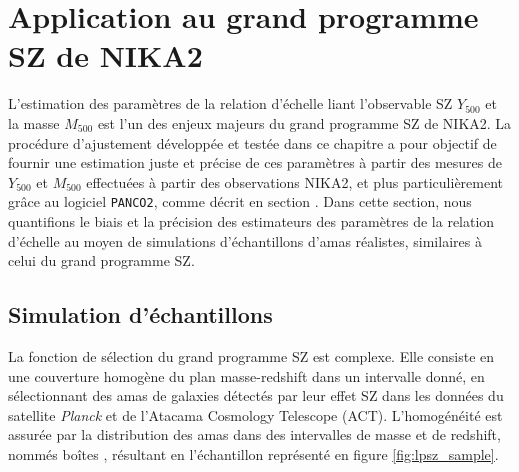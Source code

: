 \section{Application au grand programme SZ de NIKA2}
\label{sec:scaling:lpsz}

L'estimation des paramètres de la relation d'échelle liant l'observable SZ $Y_{500}$ et la masse $M_{500}$ est l'un des enjeux majeurs du grand programme SZ de NIKA2.
La procédure d'ajustement développée et testée dans ce chapitre a pour objectif de fournir une estimation juste et précise de ces paramètres à partir des mesures de $Y_{500}$ et $M_{500}$ effectuées à partir des observations NIKA2, et plus particulièrement grâce au logiciel \texttt{PANCO2}, comme décrit en section .
Dans cette section, nous quantifions le biais et la précision des estimateurs des paramètres de la relation d'échelle au moyen de simulations d'échantillons d'amas réalistes, similaires à celui du grand programme SZ.

\subsection{Simulation d'échantillons}
\label{sec:scaling:lpsz_sample_selection}

La fonction de sélection du grand programme SZ est complexe.
Elle consiste en une couverture homogène du plan masse-redshift dans un intervalle donné, en sélectionnant des amas de galaxies détectés par leur effet SZ dans les données du satellite \textit{Planck} et de l'Atacama Cosmology Telescope (ACT).
L'homogénéité est assurée par la distribution des amas dans des intervalles de masse et de redshift, nommés \guillemotleft boîtes \guillemotright, résultant en l'échantillon représenté en figure \ref{fig:lpsz_sample}.

